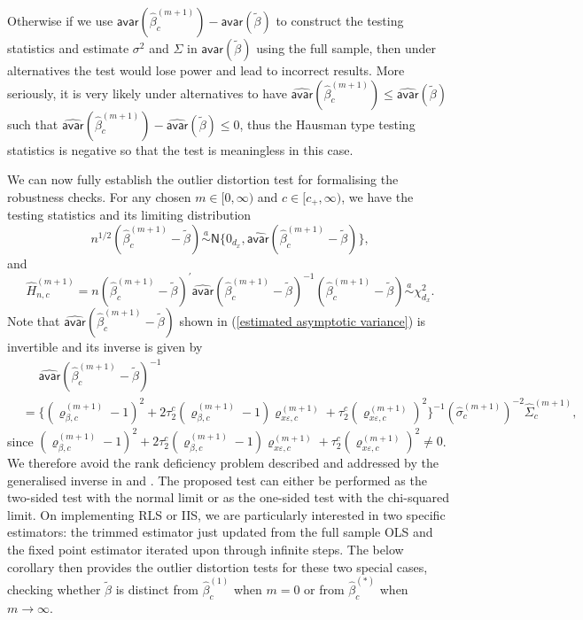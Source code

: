 \documentclass[11pt, letterpaper]{article}
\numberwithin{algorithm}{section}
\numberwithin{assumption}{section}
\numberwithin{lemma}{section}
\numberwithin{theorem}{section}
\numberwithin{corollary}{section}
\numberwithin{remark}{section}
\numberwithin{equation}{section}
\numberwithin{figure}{section}
\numberwithin{table}{section}
\begin{document}
Otherwise if we use $\mathsf{avar}(\widehat{\beta}_{c}^{(m + 1)}) - \mathsf{avar}(\widetilde{\beta})$ to construct the testing statistics and estimate $\sigma^{2}$ and $\Sigma$ in $\mathsf{avar}(\widetilde{\beta})$ using the full sample, then under alternatives the test would lose power and lead to incorrect results. More seriously, it is very likely under alternatives to have $\widehat{\mathsf{avar}}(\widehat{\beta}_{c}^{(m + 1)})  \le \widehat{\mathsf{avar}}(\widetilde{\beta})$ such that $\widehat{\mathsf{avar}}(\widehat{\beta}_{c}^{(m + 1)}) -\widehat{\mathsf{avar}}(\widetilde{\beta}) \le 0$, thus the Hausman type testing statistics is negative so that the test is meaningless in this case.

We can now fully establish the outlier distortion test for formalising the robustness checks. For any chosen $m \in [0, \infty)$ and $c \in [c_{+}, \infty)$, we have the testing statistics and its limiting distribution
\begin{equation*}
n^{1/2} (\widehat{\beta}_{c}^{(m + 1)} - \widetilde{\beta}) \overset{a}{\sim} \mathsf{N}\{ 0_{d_{x}}, \widehat{\mathsf{avar}}(\widehat{\beta}_{c}^{(m + 1)} - \widetilde{\beta}) \},
\end{equation*}
and
\begin{equation*}
\widehat{H}_{n, c}^{(m + 1)} = n (\widehat{\beta}_{c}^{(m + 1)} - \widetilde{\beta})^{\prime} \widehat{\mathsf{avar}}(\widehat{\beta}_{c}^{(m + 1)} - \widetilde{\beta})^{-1} (\widehat{\beta}_{c}^{(m + 1)} - \widetilde{\beta}) \overset{a}{\sim} \chi^{2}_{d_{x}}.
\end{equation*}
Note that $\widehat{\mathsf{avar}}(\widehat{\beta}_{c}^{(m + 1)} - \widetilde{\beta})$ shown in (\ref{estimated asymptotic variance}) is invertible and its inverse is given by
\begin{align*}
& \quad \,\, \widehat{\mathsf{avar}}(\widehat{\beta}_{c}^{(m + 1)} - \widetilde{\beta})^{-1} \\
& = \{ (\varrho_{\beta, c}^{(m + 1)} - 1)^{2} + 2 \tau_{2}^{c} (\varrho_{\beta, c}^{(m + 1)} - 1) \varrho_{x \varepsilon, c}^{(m + 1)} + \tau_{2}^{c} (\varrho_{x \varepsilon, c}^{(m + 1)})^{2} \}^{-1} (\widehat{\sigma}_{c}^{(m + 1)})^{-2} \widehat{\Sigma}_{c}^{(m + 1)},
\end{align*}
since $(\varrho_{\beta, c}^{(m + 1)} - 1)^{2} + 2 \tau_{2}^{c} (\varrho_{\beta, c}^{(m + 1)} - 1) \varrho_{x \varepsilon, c}^{(m + 1)} + \tau_{2}^{c} (\varrho_{x \varepsilon, c}^{(m + 1)})^{2} \neq 0$. We therefore avoid the rank deficiency problem described and addressed by the generalised inverse in \cite{hausman1981generalized} and \cite{holly1982remark}. The proposed test can either be performed as the two-sided test with the normal limit or as the one-sided test with the chi-squared limit. On implementing RLS or IIS, we are particularly interested in two specific estimators: the trimmed estimator just updated from the full sample OLS and the fixed point estimator iterated upon through infinite steps. The below corollary then provides the outlier distortion tests for these two special cases, checking whether $\widetilde{\beta}$ is distinct from $\widehat{\beta}_{c}^{(1)}$ when $m = 0$ or from $\widehat{\beta}_{c}^{(\ast)}$ when $m \to \infty$.
\end{document}
